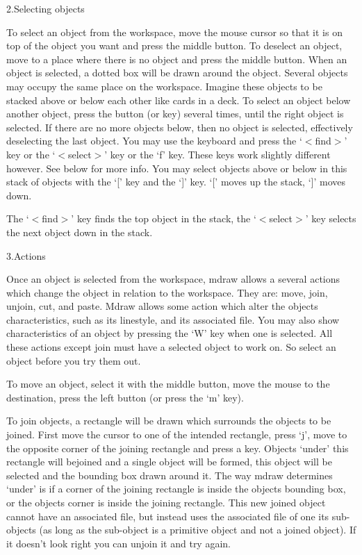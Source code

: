 \blank
{\modernlarge \item{2.}{Selecting objects }}

To select an object from the workspace, move the mouse
cursor so that it is on top of the object you want and press the middle button.
To deselect an object, move to a place where there is no object and press the
middle button.
When an object is selected, a dotted box will be drawn around the object.
Several objects may occupy the same place on the workspace. Imagine these
objects to be stacked above or below each other like cards in a deck. 
To select an object below
another object, press the button (or key) several times, until the right object
is selected. If there are no more objects below, then no object is selected,
effectively deselecting the last object. You may use the keyboard and press 
the `$<$find$>$' key or the
`$<$select$>$' key or the `f' key. These keys work slightly different however. See
below for more info. You may select objects above or below in this stack of
objects with the `[' key and the `]' key. `[' moves up the stack, `]' moves
down. 

The `$<$find$>$' key finds the top object in the stack, the `$<$select$>$' key
selects the next object down in the stack.

\blank
{\modernlarge \item{3.}{Actions}}

Once an object is selected from the workspace, mdraw allows a several
actions which change the object in relation to the workspace. 
They are: move, join, unjoin, cut, and paste. Mdraw allows some action which alter the objects
characteristics, such as its linestyle, and its associated file. You may also
show characteristics of an object by pressing the `W' key when one is selected.
All these actions except join must have a selected object to work on. So select an object
before you try them out. 

To move an object, select it with the middle button, move the
mouse to the destination, press the left button (or press the `m' key).

To join objects, a rectangle will be drawn which surrounds the objects to be
joined. First move the cursor to one of the intended rectangle, press `j', move
to the opposite corner of the joining rectangle and press a key. Objects `under'
this rectangle will bejoined and a single object will be formed, this object
will be selected and the bounding box drawn around it. The way mdraw determines
`under' is if a corner of the joining rectangle is inside the objects bounding
box, or the objects corner is inside the joining rectangle. This new joined
object cannot have an associated file, but instead uses the associated file of
one its sub-objects (as long as the sub-object is a primitive object and not a
joined object). If it doesn't look right you can unjoin it and try again. 

